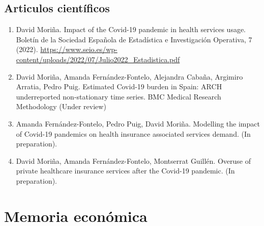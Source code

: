 \documentclass[12pt,twoside]{article} %
\begin{document}
\subsection{Articulos científicos}
\begin{enumerate}
\item David Moriña. Impact of the Covid-19 pandemic in health services usage. Boletín de la Sociedad Española de Estadística e Investigación Operativa, 7 (2022). \url{https://www.seio.es/wp-content/uploads/2022/07/Julio2022_Estadistica.pdf}
\item David Moriña, Amanda Fernández-Fontelo, Alejandra Cabaña, Argimiro Arratia, Pedro Puig. Estimated Covid-19 burden in Spain: ARCH underreported non-stationary time series. BMC Medical Research Methodology (Under review)
\item Amanda Fernández-Fontelo, Pedro Puig, David Moriña. Modelling the impact of Covid-19 pandemics on health insurance associated services demand. (In preparation).
\item David Moriña, Amanda Fernández-Fontelo, Montserrat Guillén. Overuse of private healthcare insurance services after the Covid-19 pandemic. (In preparation).
\end{enumerate}

\section{Memoria económica}


\parskip=0pt
\parsep=0pt



\end{document}
